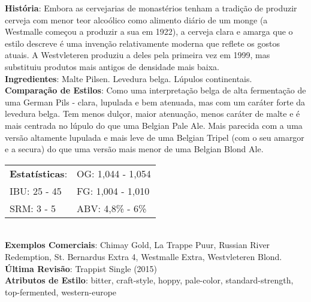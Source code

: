 \textbf{História}: Embora as cervejarias de monastérios tenham a tradição de produzir cerveja com menor teor alcoólico como alimento diário de um monge (a Westmalle começou a produzir a sua em 1922), a cerveja clara e amarga que o estilo descreve é uma invenção relativamente moderna que reflete os gostos atuais. A Westvleteren produziu a deles pela primeira vez em 1999, mas substituiu produtos mais antigos de densidade mais baixa. \\
\textbf{Ingredientes}: Malte Pilsen. Levedura belga. Lúpulos continentais. \\
\textbf{Comparação de Estilos}: Como uma interpretação belga de alta fermentação de uma German Pils - clara, lupulada e bem atenuada, mas com um caráter forte da levedura belga. Tem menos dulçor, maior atenuação, menos caráter de malte e é mais centrada no lúpulo do que uma Belgian Pale Ale. Mais parecida com a uma versão altamente lupulada e mais leve de uma Belgian Tripel (com o seu amargor e a secura) do que uma versão mais menor de uma Belgian Blond Ale. \\
\begin{tabular}{@{}p{35mm}p{35mm}@{}}
  \textbf{Estatísticas}: & OG: 1,044 - 1,054 \\
  IBU: 25 - 45  & FG: 1,004 - 1,010  \\
  SRM: 3 - 5  & ABV: 4,8\% - 6\%
\end{tabular}\\
\textbf{Exemplos Comerciais}: Chimay Gold, La Trappe Puur, Russian River Redemption, St. Bernardus Extra 4, Westmalle Extra, Westvleteren Blond. \\
\textbf{Última Revisão}: Trappist Single (2015) \\
\textbf{Atributos de Estilo}: bitter, craft-style, hoppy, pale-color, standard-strength, top-fermented, western-europe

